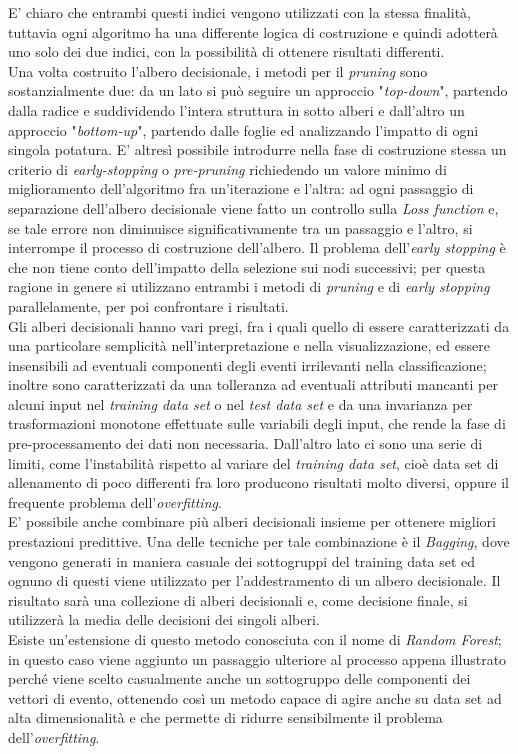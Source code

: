 E' chiaro che entrambi questi indici vengono utilizzati con la stessa finalità, tuttavia ogni algoritmo ha una differente logica di costruzione e quindi adotterà uno solo dei due indici, con la possibilità di ottenere risultati differenti. \\
Una volta costruito l'albero decisionale, i metodi per il \textit{pruning} sono sostanzialmente due: da un lato si può seguire un approccio "\textit{top-down}", partendo dalla radice e suddividendo l'intera struttura in sotto alberi e dall'altro un approccio "\textit{bottom-up}", partendo dalle foglie ed analizzando l'impatto di ogni singola potatura. E' altresì possibile introdurre nella fase di costruzione stessa un criterio di \textit{early-stopping} o \textit{pre-pruning} richiedendo un valore minimo di miglioramento dell'algoritmo fra un'iterazione e l'altra: ad ogni passaggio di separazione dell'albero decisionale viene fatto un controllo sulla \textit{Loss function} e, se tale errore non diminuisce significativamente tra un passaggio e l'altro, si interrompe il processo di costruzione dell'albero. Il problema dell'\textit{early stopping} è che non tiene conto dell'impatto della selezione sui nodi successivi; per questa ragione in genere si utilizzano entrambi i metodi di \textit{pruning} e di \textit{early stopping} parallelamente, per poi confrontare i risultati. \\
Gli alberi decisionali hanno vari pregi, fra i quali quello di essere caratterizzati da una particolare semplicità nell'interpretazione e nella visualizzazione, ed essere insensibili ad eventuali componenti degli eventi irrilevanti nella classificazione; inoltre sono caratterizzati da una tolleranza ad eventuali attributi mancanti per alcuni input nel \textit{training data set} o nel \textit{test data set} e da una invarianza per trasformazioni monotone effettuate sulle variabili degli input, che rende la fase di pre-processamento dei dati non necessaria. Dall'altro lato ci sono una serie di limiti, come l'instabilità rispetto al variare del \textit{training data set}, cioè data set di allenamento di poco differenti fra loro producono risultati molto diversi, oppure il frequente problema dell'\textit{overfitting}. \\
E' possibile anche combinare più alberi decisionali insieme per ottenere migliori prestazioni predittive. Una delle tecniche per tale combinazione è il \textit{Bagging}, dove vengono generati in maniera casuale dei sottogruppi del training data set ed ognuno di questi viene utilizzato per l'addestramento di un albero decisionale. Il risultato sarà una collezione di alberi decisionali e, come decisione finale, si utilizzerà la media delle decisioni dei singoli alberi. \\
Esiste un'estensione di questo metodo conosciuta con il nome di \textit{Random Forest}; in questo caso viene aggiunto un passaggio ulteriore al processo appena illustrato perché viene scelto casualmente anche un sottogruppo delle componenti dei vettori di evento, ottenendo così un metodo capace di agire anche su data set ad alta dimensionalità e che permette di ridurre sensibilmente il problema dell'\textit{overfitting}.

